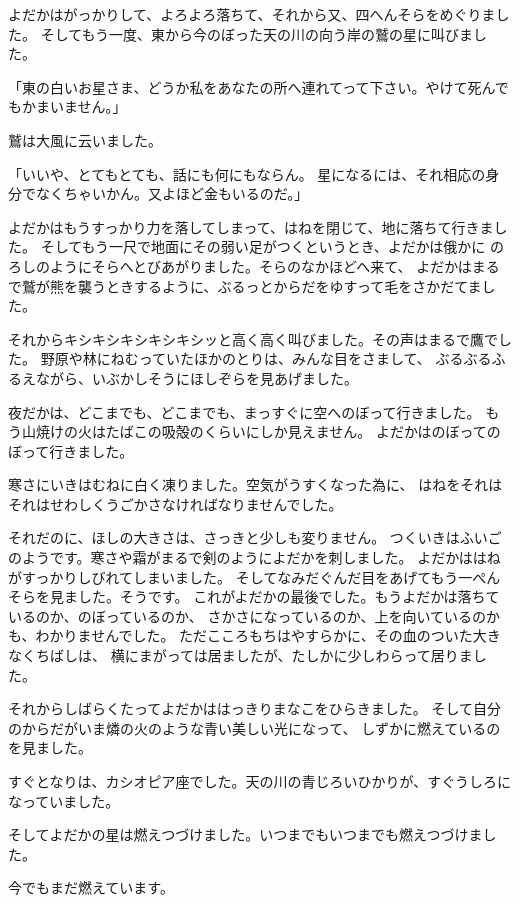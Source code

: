 \documentclass[a4paper, platex, dvipdfmx]{jsarticle}
\begin{document}
よだかはがっかりして、よろよろ落ちて、それから又、四へんそらをめぐりました。
そしてもう一度、東から今のぼった天の川の向う岸の鷲の星に叫びました。

「東の白いお星さま、どうか私をあなたの所へ連れてって下さい。やけて死んでもかまいません。」

鷲は大風に云いました。

「いいや、とてもとても、話にも何にもならん。
星になるには、それ相応の身分でなくちゃいかん。又よほど金もいるのだ。」

よだかはもうすっかり力を落してしまって、はねを閉じて、地に落ちて行きました。
そしてもう一尺で地面にその弱い足がつくというとき、よだかは俄かに
のろしのようにそらへとびあがりました。そらのなかほどへ来て、
よだかはまるで鷲が熊を襲うときするように、ぶるっとからだをゆすって毛をさかだてました。

それからキシキシキシキシキシッと高く高く叫びました。その声はまるで鷹でした。
野原や林にねむっていたほかのとりは、みんな目をさまして、
ぶるぶるふるえながら、いぶかしそうにほしぞらを見あげました。

夜だかは、どこまでも、どこまでも、まっすぐに空へのぼって行きました。
もう山焼けの火はたばこの吸殻のくらいにしか見えません。
よだかはのぼってのぼって行きました。

寒さにいきはむねに白く凍りました。空気がうすくなった為に、
はねをそれはそれはせわしくうごかさなければなりませんでした。

それだのに、ほしの大きさは、さっきと少しも変りません。
つくいきはふいごのようです。寒さや霜がまるで剣のようによだかを刺しました。
よだかははねがすっかりしびれてしまいました。
そしてなみだぐんだ目をあげてもう一ぺんそらを見ました。そうです。
これがよだかの最後でした。もうよだかは落ちているのか、のぼっているのか、
さかさになっているのか、上を向いているのかも、わかりませんでした。
ただこころもちはやすらかに、その血のついた大きなくちばしは、
横にまがっては居ましたが、たしかに少しわらって居りました。

それからしばらくたってよだかははっきりまなこをひらきました。
そして自分のからだがいま燐の火のような青い美しい光になって、
しずかに燃えているのを見ました。

すぐとなりは、カシオピア座でした。天の川の青じろいひかりが、すぐうしろになっていました。

そしてよだかの星は燃えつづけました。いつまでもいつまでも燃えつづけました。

今でもまだ燃えています。
\end{document}
